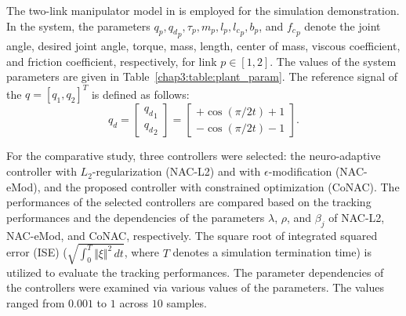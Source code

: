 The two-link manipulator model in \cite{RN33} is employed for the simulation demonstration.
In the system, the parameters $q_p,{q_d}_p,\tau_p,m_p,l_p,{l_c}_p,b_p$, and ${f_c}_p$ denote the joint angle, desired joint angle, torque, mass, length, center of mass, viscous coefficient, and friction coefficient, respectively, for link $p\in[1,2]$.
The values of the system parameters are given in Table~\ref{chap3:table:plant_param}.
The reference signal of the $q=[q_1,q_2]^T$ is defined as follows:
\begin{equation}
    q_d
    =
    \begin{bmatrix}
        {q_d}_1\\
        {q_d}_2
    \end{bmatrix}
    = 
    \begin{bmatrix}
        +\cos(\pi/2 t) + 1 \\
        -\cos(\pi/2 t) - 1 
    \end{bmatrix}
    .
\end{equation}

For the comparative study, three controllers were selected: the neuro-adaptive controller with $L_2$-regularization (NAC-L2) and with $\epsilon$-modification (NAC-eMod), and the proposed controller with constrained optimization (CoNAC).
The performances of the selected controllers are compared based on the tracking performances and the dependencies of the parameters $\lambda$, $\rho$, and $\beta_j$ of NAC-L2, NAC-eMod, and CoNAC, respectively.
The square root of integrated squared error (ISE) (\ie $\sqrt{\int_0^T\Vert\xi\Vert^2\,dt}$, where $T$ denotes a simulation termination time) is utilized to evaluate the tracking performances.
The parameter dependencies of the controllers were examined via various values of the parameters. 
The values ranged from $0.001$ to $1$ across $10$ samples.

